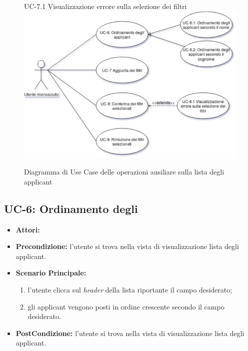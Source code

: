 \vspace{0.5em}
\begin{figure}[!h] UC-7.1 Visualizzazione errore sulla selezione dei filtri
	\centering 
	\includegraphics[width=1\columnwidth]{immagini/usecase/UC2} 
	\caption{Diagramma di Use Case delle operazioni ausiliare sulla lista degli applicant}
	\label{figura:uc-2}
\end{figure}

\subsection{UC-6: Ordinamento degli\applicant}
\begin{itemize}
	\item \textbf{Attori:}\loggedusr
	\item \textbf{Precondizione:} l'utente si trova nella vista di visualizzazione lista degli applicant.
	\item \textbf{Scenario Principale:}
	\begin{enumerate}
		\item l'utente clicca sul \textit{header} della lista riportante il campo desiderato;
		\item gli applicant vengono posti in ordine crescente secondo il campo desiderato.
	\end{enumerate}
	\item \textbf{PostCondizione:}  l'utente si trova nella vista di visualizzazione lista degli applicant.
\end{itemize}


